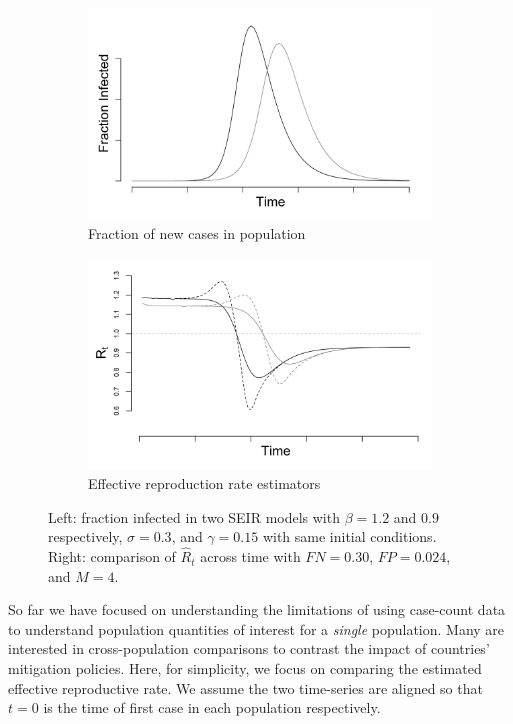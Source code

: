 \documentclass[11pt]{amsart}
\numberwithin{equation}{section}
\theoremstyle{plain}
\begin{document}
 \begin{figure}[!th]
 \centering
 \begin{subfigure}{.5\textwidth}
  \centering
  \includegraphics[width=.9\linewidth]{../figs/seir.png}
  \caption{Fraction of new cases in population}
  \label{fig:fracpop}
 \end{subfigure}%
 \begin{subfigure}{.5\textwidth}
  \centering
  \includegraphics[width=.9\linewidth]{../figs/seir_rt_comparison.png}
  \caption{Effective reproduction rate estimators}
  \label{fig:eff}
 \end{subfigure}
 \caption{Left: fraction infected in two SEIR models with $\beta = 1.2$ and $0.9$ respectively, $\sigma = 0.3$, and $\gamma = 0.15$ with same initial conditions. Right: comparison of $\hat R_t$ across time with $FN = 0.30$, $FP = 0.024$, and $M = 4$.}
 \label{fig:comparison}
 \end{figure}


 So far we have focused on understanding the limitations of using case-count data to understand population quantities of interest for a \emph{single} population.  Many are interested in cross-population comparisons to contrast the impact of countries' mitigation policies.  Here, for simplicity, we focus on comparing the estimated effective reproductive rate.  We assume the two time-series are aligned so that $t=0$ is the time of first case in each population respectively.
\end{document}

